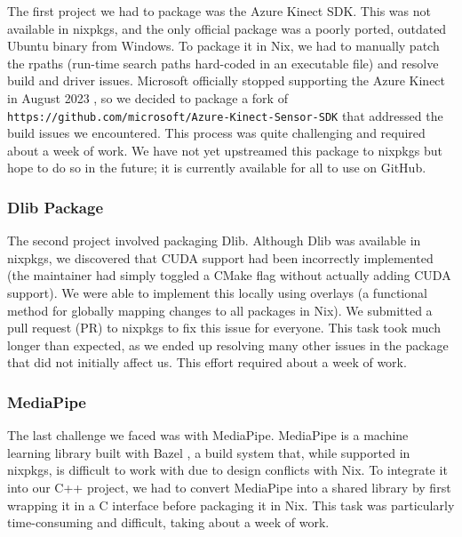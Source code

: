 The first project we had to package was the Azure Kinect SDK. This was not available in nixpkgs, and the only official package was a poorly ported, outdated Ubuntu binary from Windows. To package it in Nix, we had to manually patch the rpaths (run-time search paths hard-coded in an executable file) and resolve build and driver issues. Microsoft officially stopped supporting the Azure Kinect in August 2023 \cite{noauthor_microsofts_nodate}, so we decided to package a fork of \texttt{https://github.com/microsoft/Azure-Kinect-Sensor-SDK} that addressed the build issues we encountered. This process was quite challenging and required about a week of work. We have not yet upstreamed this package to nixpkgs but hope to do so in the future; it is currently available for all to use on GitHub.

\subsubsection{Dlib Package}

The second project involved packaging Dlib. Although Dlib was available in nixpkgs, we discovered that CUDA support had been incorrectly implemented (the maintainer had simply toggled a CMake flag without actually adding CUDA support). We were able to implement this locally using overlays (a functional method for globally mapping changes to all packages in Nix). We submitted a pull request (PR) to nixpkgs to fix this issue for everyone. This task took much longer than expected, as we ended up resolving many other issues in the package that did not initially affect us. This effort required about a week of work.

\subsubsection{MediaPipe}

The last challenge we faced was with MediaPipe. MediaPipe is a machine learning library built with Bazel \cite{noauthor_bazelbuildbazel_2024}, a build system that, while supported in nixpkgs, is difficult to work with due to design conflicts with Nix. To integrate it into our C++ project, we had to convert MediaPipe into a shared library by first wrapping it in a C interface before packaging it in Nix. This task was particularly time-consuming and difficult, taking about a week of work.
